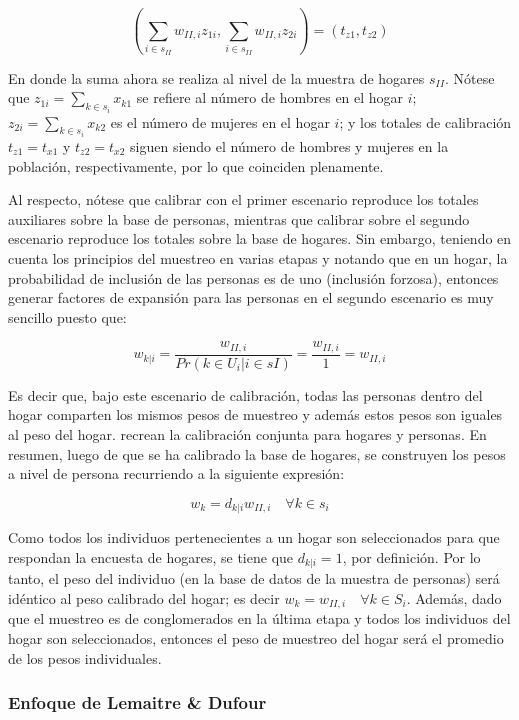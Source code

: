 \documentclass[
  12pt,
]{book}
\begin{document}
\[
\left ( \sum_{i \in s_{II}} w_{II,i} z_{1i}, \sum_{i \in s_{II}} w_{II,i} z_{2i}\right )=(t_{z1}, t_{z2})
\]

En donde la suma ahora se realiza al nivel de la muestra de hogares \(s_{II}\). Nótese que \(z_{1i}=\sum_{k \in s_i} x_{k1}\) se refiere al número de hombres en el hogar \(i\); \(z_{2i}=\sum_{k \in s_i} x_{k2}\) es el número de mujeres en el hogar \(i\); y los totales de calibración \(t_{z1} = t_{x1}\) y \(t_{z2} = t_{x2}\) siguen siendo el número de hombres y mujeres en la población, respectivamente, por lo que coinciden plenamente.

Al respecto, nótese que calibrar con el primer escenario reproduce los totales auxiliares sobre la base de personas, mientras que calibrar sobre el segundo escenario reproduce los totales sobre la base de hogares. Sin embargo, teniendo en cuenta los principios del muestreo en varias etapas y notando que en un hogar, la probabilidad de inclusión de las personas es de uno (inclusión forzosa), entonces generar factores de expansión para las personas en el segundo escenario es muy sencillo puesto que:

\[
w_{k|i}= \frac{w_{II,i}}{Pr(k \in U_i | i \in sI)} = \frac{w_{II,i}}{1} = w_{II,i}
\]

Es decir que, bajo este escenario de calibración, todas las personas dentro del hogar comparten los mismos pesos de muestreo y además estos pesos son iguales al peso del hogar. \citet[sec.~5]{Estevao_Sarndal_2006} recrean la calibración conjunta para hogares y personas. En resumen, luego de que se ha calibrado la base de hogares, se construyen los pesos a nivel de persona recurriendo a la siguiente expresión:

\[
w_k = d_{k|i}w_{II,i} \quad \forall k \in s_i
\]

Como todos los individuos pertenecientes a un hogar son seleccionados para que respondan la encuesta de hogares, se tiene que \(d_{k|i} = 1\), por definición. Por lo tanto, el peso del individuo (en la base de datos de la muestra de personas) será idéntico al peso calibrado del hogar; es decir \(w_k = w_{II,i} \quad \forall k \in S_i\). Además, dado que el muestreo es de conglomerados en la última etapa y todos los individuos del hogar son seleccionados, entonces el peso de muestreo del hogar será el promedio de los pesos individuales.

\hypertarget{enfoque-de-lemaitre-dufour}{%
\subsubsection{Enfoque de Lemaitre \& Dufour}\label{enfoque-de-lemaitre-dufour}}
\end{document}
